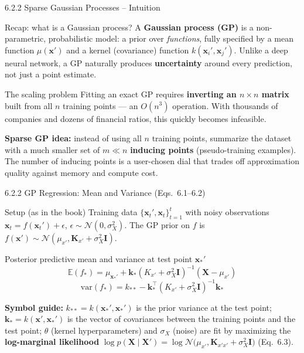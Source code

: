 \documentclass[aspectratio=169,10pt]{beamer}
\newcommand{\Exp}{\mathbb{E}}
\newcommand{\Norm}{\mathcal{N}}
\newcommand{\x}{\mathbf{x}}
\newcommand{\X}{\mathbf{X}}
\begin{document}
\begin{frame}{6.2.2 Sparse Gaussian Processes -- Intuition}
  \begin{block}{Recap: what is a Gaussian process?}
    A \textbf{Gaussian process (GP)} is a non-parametric, probabilistic model:
    a prior over \emph{functions}, fully specified by a mean function
    $\mu(\x')$ and a kernel (covariance) function $k(\x_i',\x_j')$. Unlike a
    deep neural network, a GP naturally produces \textbf{uncertainty} around
    every prediction, not just a point estimate.
  \end{block}
  \begin{alertblock}{The scaling problem}
    Fitting an exact GP requires \textbf{inverting an $n\times n$ matrix}
    built from all $n$ training points --- an $O(n^3)$ operation. With
    thousands of companies and dozens of financial ratios, this quickly
    becomes infeasible.
  \end{alertblock}
  \textbf{Sparse GP idea:} instead of using all $n$ training points, summarize
  the dataset with a much smaller set of $m \ll n$ \textbf{inducing points}
  (pseudo-training examples). The number of inducing points is a user-chosen
  dial that trades off approximation quality against memory and compute cost.
\end{frame}

\begin{frame}{6.2.2 GP Regression: Mean and Variance (Eqs.\ 6.1--6.2)}
  \begin{block}{Setup (as in the book)}
    Training data $\{\x_t', \x_t\}_{t=1}^t$ with noisy observations
    $\x_t = f(\x_t') + \epsilon$, $\epsilon \sim \Norm(0,\sigma_X^2)$. The GP
    prior on $f$ is $f(\x') \sim \Norm(\mu_{x'}, \mathbf{K}_{x'} + \sigma_X^2\mathbf{I})$.
  \end{block}
  \begin{block}{Posterior predictive mean and variance at test point $\x_*'$}
    \[
      \Exp(f_*) = \mu_{\x_*'} + \mathbf{k}_* (K_{x'} + \sigma_X^2 \mathbf{I})^{-1}(\X - \mu_{x'})
      \tag{6.1}
    \]
    \[
      \mathrm{var}(f_*) = k_{**} - \mathbf{k}_*^\top (K_{x'} + \sigma_X^2 \mathbf{I})^{-1}\mathbf{k}_*
      \tag{6.2}
    \]
  \end{block}
  \textbf{Symbol guide:} $k_{**} = k(\x_*', \x_*')$ is the prior variance at
  the test point; $\mathbf{k}_* = k(\x', \x_*')$ is the vector of covariances
  between the training points and the test point; $\theta$ (kernel
  hyperparameters) and $\sigma_X$ (noise) are fit by maximizing the
  \textbf{log-marginal likelihood}
  $\log p(\X\mid\X') = \log \Norm\bigl(\mu_{x'}, \mathbf{K}_{x'x'}+\sigma_X^2\mathbf{I}\bigr)$ (Eq.\ 6.3).
\end{frame}
\end{document}
